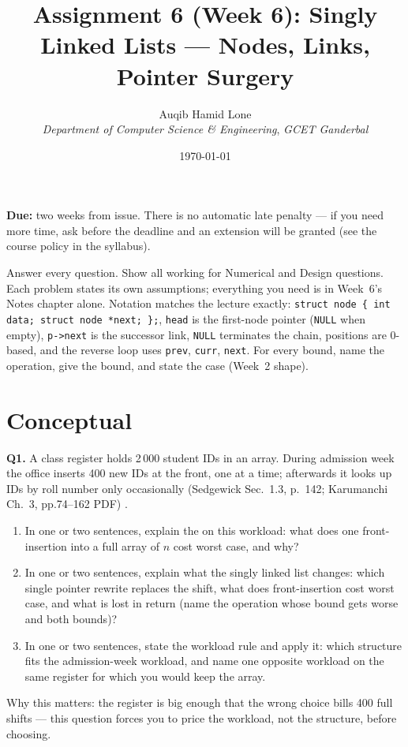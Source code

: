\documentclass[11pt]{article}
\title{Assignment 6 (Week 6): Singly Linked Lists --- Nodes, Links, Pointer Surgery}
\author{Auqib Hamid Lone\\[0.3em]
  \emph{Department of Computer Science \& Engineering}, \emph{GCET Ganderbal}}
\date{\today}
\begin{document}
\maketitle

\noindent\textbf{Due:} two weeks from issue. There is no automatic late penalty --- if you need more time, ask before the deadline and an extension will be granted (see the course policy in the syllabus).

\noindent Answer every question. Show all working for Numerical and Design questions. Each problem states its own assumptions; everything you need is in Week~6's Notes chapter alone. Notation matches the lecture exactly: \texttt{struct node \{ int data; struct node *next; \};}, \texttt{head} is the first-node pointer (\texttt{NULL} when empty), \texttt{p->next} is the successor link, \texttt{NULL} terminates the chain, positions are 0-based, and the reverse loop uses \texttt{prev}, \texttt{curr}, \texttt{next}. For every bound, name the operation, give the bound, and state the case (Week~2 shape).

\section{Conceptual}

\textbf{Q1.} A class register holds 2\,000 student IDs in an array. During admission week the office inserts 400 new IDs at the front, one at a time; afterwards it looks up IDs by roll number only occasionally (Sedgewick Sec.~1.3, p.~142; Karumanchi Ch.~3, pp.74--162 PDF) \cite{Sedgewick2011_algorithms,Karumanchi2017_data_structures_algorithms_made_easy}.
\begin{enumerate}
  \item[(a)] In one or two sentences, explain the  on this workload: what does one front-insertion into a full array of $n$ cost worst case, and why?
  \item[(b)] In one or two sentences, explain what the singly linked list changes: which single pointer rewrite replaces the shift, what does front-insertion cost worst case, and what is lost in return (name the operation whose bound gets worse and both bounds)?
  \item[(c)] In one or two sentences, state the workload rule and apply it: which structure fits the admission-week workload, and name one opposite workload on the same register for which you would keep the array.
\end{enumerate}
Why this matters: the register is big enough that the wrong choice bills 400 full shifts --- this question forces you to price the workload, not the structure, before choosing.
\end{document}
